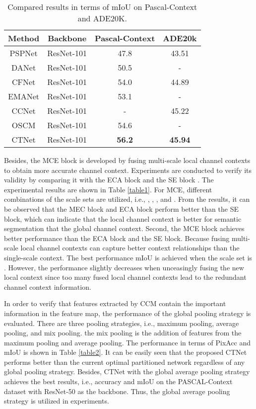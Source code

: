 \documentclass[10pt,journal,cspaper,compsoc]{IEEEtran}
\begin{document}
\begin{table}[!t]
\caption{Compared results in terms of mIoU on Pascal-Context and ADE20K.}
\label{table4}
\renewcommand\arraystretch{1.3}
		\centering
		\begin{tabular}{c|c|c|c}
			\hline
			Method &Backbone&Pascal-Context &ADE20k\\
			\hline
			PSPNet \cite{zhao2017pyramid}  & ResNet-101&47.8 &43.51\\
			\hline
			DANet \cite{fu2019dual}&  ResNet-101 &50.5& -\\
			CFNet \cite{zhang2019co} & ResNet-101 & 54.0& 44.89\\
			EMANet \cite{li2019expectation}& ResNet-101& 53.1& -\\
			CCNet \cite{huang2019ccnet}& ResNet-101 & - & 45.22\\
			\hline
			OSCM &ResNet-101&54.6&-\\
			CTNet &ResNet-101 &\textbf{56.2}& \textbf{45.94}\\
			\hline
\end{tabular}
\end{table}
	
Besides, the MCE block is developed by fusing multi-scale local channel contexts to obtain more accurate channel context. Experiments are conducted to verify its validity by comparing it with the ECA block \cite{wang2020eca} and the SE block \cite{hu2018squeeze}. The experimental results are shown in Table \ref{table1}. For MCE, different combinations of the scale sets are utilized, i.e., , , , and . From the results, it can be observed that the MEC block and ECA block perform better than the SE block, which can indicate that the local channel context is better for semantic segmentation that the global channel context. Second, the MCE block achieves better performance than the ECA block and the SE block. Because fusing multi-scale local channel contexts can capture better context relationships than the single-scale context. The best performance  mIoU is achieved when the scale set is . However, the performance slightly decreases when unceasingly fusing the new local context since too many fused local channel contexts lead to the redundant channel context information.
	
In order to verify that features extracted by CCM contain the important information in the feature map, the performance of the global pooling strategy is evaluated. There are three pooling strategies, i.e., maximum pooling, average pooling, and mix pooling. the mix pooling is the addition of features from the maximum pooling and average pooling. The performance in terms of PixAcc and mIoU is shown in Table \ref{table2}. It can be easily seen that the proposed CTNet performs better than the current optimal partitioned network regardless of any global pooling strategy. Besides, CTNet with the global average pooling strategy achieves the best results, i.e.,  accuracy and  mIoU on the PASCAL-Context dataset with ResNet-50 as the backbone. Thus, the global average pooling strategy is utilized in experiments.
	
\end{document}
